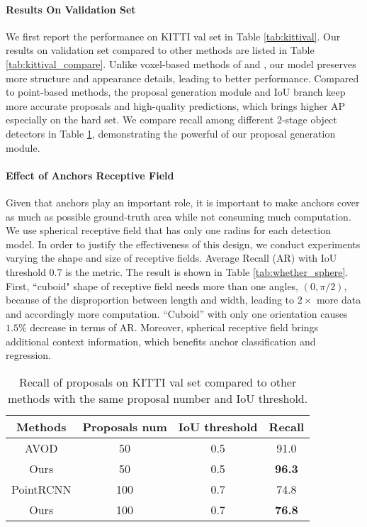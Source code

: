 \documentclass[10pt,twocolumn,letterpaper]{article}
\begin{document}
\vspace{-0.1in}
\paragraph{Results On Validation Set}
We first report the performance on KITTI val set in Table \ref{tab:kittival}. Our results on validation set compared to other methods are listed in Table \ref{tab:kittival_compare}. Unlike voxel-based methods of \cite{VOXELNET} and \cite{yan2018second}, our model preserves more structure and appearance details, leading to better performance. Compared to point-based methods, the proposal generation module and IoU branch keep more accurate proposals and high-quality predictions, which brings higher AP especially on the hard set. 
We compare recall among different 2-stage object detectors in Table \ref{tab:whether_proposal}, demonstrating the powerful of our proposal generation module.



\vspace{-0.1in}
\paragraph{Effect of Anchors Receptive Field}
Given that anchors play an important role, it is important to make anchors cover as much as possible ground-truth area while not consuming much computation. We use spherical receptive field that has only one radius for each detection model. In order to justify the effectiveness of this design, we conduct  experiments varying the shape and size of receptive fields. Average Recall (AR) with IoU threshold 0.7 is the metric. The result is shown in Table \ref{tab:whether_sphere}. First, ``cuboid" shape of receptive field needs more than one angles, \ie $(0, \pi / 2)$, because of the disproportion between length and width, leading to $2 \times$ more data and accordingly more computation. ``Cuboid'' with only one orientation causes $1.5 \%$ decrease in terms of AR. Moreover, spherical receptive field brings additional context information, which benefits anchor classification and regression.

\begin{table}[t]
   \centering \addtolength{\tabcolsep}{-1pt}
   \footnotesize
   \begin{tabular}{|c|c|c|c|}
       \hline
       Methods & Proposals num & IoU threshold & Recall\\
       \hline
       AVOD \cite{AVOD} & 50 & 0.5 & 91.0 \\
       Ours & 50 & 0.5 & \bf 96.3 \\
       \hline
       PointRCNN \cite{shi2018pointrcnn} & 100 & 0.7 & 74.8 \\
       Ours & 100 & 0.7 & \bf 76.8 \\
      \hline
   \end{tabular}\vspace{0.1cm}
   \caption{Recall of proposals on KITTI val set compared to other methods with the same proposal number and IoU threshold.}
   \label{tab:whether_proposal}
\end{table}
\end{document}
